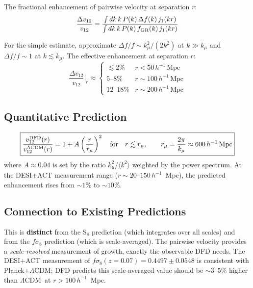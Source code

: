 \documentclass[11pt]{article}
\newcommand{\LCDM}{$\Lambda$CDM}
\begin{document}
The fractional enhancement of pairwise velocity at separation $r$:
\begin{equation}
\frac{\Delta v_{12}}{v_{12}} = \frac{\int dk\,k\,P(k)\,\Delta f(k)\,j_1(kr)}
{\int dk\,k\,P(k)\,f_{\rm GR}(k)\,j_1(kr)}
\end{equation}

For the simple estimate, approximate $\Delta f/f \sim k_\mu^2/(2k^2)$ at
$k \gg k_\mu$ and $\Delta f/f \sim 1$ at $k \lesssim k_\mu$. The effective
enhancement at separation $r$:
\begin{equation}
\frac{\Delta v_{12}}{v_{12}}\bigg|_{r} \approx
\begin{cases}
\lesssim 2\% & r < 50\,h^{-1}\,\text{Mpc} \\
5\text{--}8\% & r \sim 100\,h^{-1}\,\text{Mpc} \\
12\text{--}18\% & r \sim 200\,h^{-1}\,\text{Mpc}
\end{cases}
\label{eq:pairwise_enhancement}
\end{equation}

\subsection{Quantitative Prediction}

\begin{equation}
\boxed{
\frac{v_{12}^{\rm DFD}(r)}{v_{12}^{\rm \Lambda CDM}(r)} = 1 + A\left(\frac{r}{r_\mu}\right)^2
\quad\text{for}\quad r \lesssim r_\mu,\qquad
r_\mu = \frac{2\pi}{k_\mu} \approx 600\,h^{-1}\,\text{Mpc}
}
\end{equation}
where $A \approx 0.04$ is set by the ratio $k_\mu^2/\langle k^2\rangle$
weighted by the power spectrum. At the DESI+ACT measurement range
($r \sim 20$--$150\,h^{-1}$~Mpc), the predicted enhancement rises from
$\sim 1\%$ to $\sim 10\%$.

\subsection{Connection to Existing Predictions}

This is \textbf{distinct} from the S$_8$ prediction (which integrates over
all scales) and from the $f\sigma_8$ prediction (which is scale-averaged).
The pairwise velocity provides a \emph{scale-resolved} measurement of
growth, exactly the observable DFD needs. The DESI+ACT measurement of
$f\sigma_8(z=0.07) = 0.4497 \pm 0.0548$ is consistent with Planck+\LCDM;
DFD predicts this scale-averaged value should be $\sim 3$--$5\%$ higher
than \LCDM\ at $r > 100\,h^{-1}$~Mpc.
\end{document}
